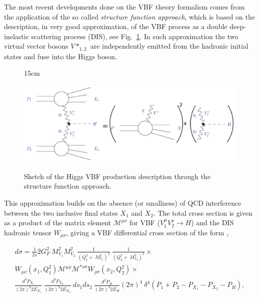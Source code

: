 The most recent developments done on the VBF theory formalism comes from the application of the so called \textit{structure function approach}, which is based on the description, in very good approximation, of the VBF process as a double deep-inelastic scattering process (DIS), see Fig.~\ref{fig:vbf_DIS_approx}. In such approximation the two virtual vector bosons $V*_{1,2}$ are independently emitted from the hadronic initial states and fuse into the Higgs boson. 

\begin{figure}[htbp]{15cm}
	\caption{Sketch of the Higgs VBF production description through the structure function approach.}
	\includegraphics[scale=0.4]{ChapterTheory/figs/vbf_DIS_approximation}
	\label{fig:vbf_DIS_approx}
\end{figure}

This approximation builds on the absence (or smallness) of QCD interference between the two inclusive final states $X_{1}$ and $X_{2}$. The total cross section is given as a product of the matrix element $\mathcal{M}^{\mu\nu}$ for VBF ($V_{1}^{\mu}V_{2}^{\nu} \rightarrow H$) and the DIS hadronic tensor $W_{\mu\nu}$, giving a VBF differential cross section of the form \cite{bib:PhysRevLett105-011801-2010,bib:PhysRevLett69-3274-1992},

\begin{eqnarray}
\nonumber
d\sigma = \frac{1}{2s}2G_{F}^{2}~M_{V_{1}}^{2}M_{V_{2}}^{2}~\frac{1}{(Q_{1}^{2}+~M_{V_{1}}^{2})^{2}}~\frac{1}{(Q_{2}^{2}+~M_{V_{2}}^{2})^{2}}\times\\
\nonumber
W_{\mu\nu}(x_{1},Q_{1}^{2})\mathcal{M}^{\mu\rho}\mathcal{M}^{*\nu\sigma}W_{\rho\sigma}(x_{2},Q_{2}^{2})\times\\ \frac{d^{3}P_{X_{1}}}{(2\pi)^{3}2E_{X_{1}}}~\frac{d^{3}P_{X_{2}}}{(2\pi)^{3}2E_{X_{2}}}~ds_{1}ds_{2}~\frac{d^{3}P_{H}}{(2\pi)^{3}2E_{H}}
(2\pi)^{4}~\delta^{4}(P_{1}+P_{2}-P_{X_{1}}-P_{X_{2}}-P_{H}),
\label{eq:vbf_dis_differential_XS}
\end{eqnarray}

